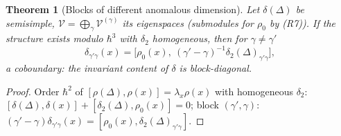 \documentclass[10pt]{article}
\newtheorem{theorem}{Theorem}[section]
\theoremstyle{definition}
\newcommand{\V}{\mathcal V}
\begin{document}
\begin{theorem}[Blocks of different anomalous dimension]\label{thm:blocks}
Let $\delta(\Delta)$ be semisimple, $\V=\bigoplus_\gamma\V^{(\gamma)}$ its eigenspaces (submodules for $\rho_0$ by (R7)). If the structure exists modulo $\hbar^3$ with $\delta_2$ homogeneous, then for $\gamma\ne\gamma'$
\[
\delta_{\gamma'\gamma}(x)=\big[\rho_0(x),\ (\gamma'-\gamma)^{-1}\delta_2(\Delta)_{\gamma'\gamma}\big],
\]
a coboundary: the invariant content of $\delta$ is block-diagonal.
\end{theorem}
\begin{proof}
Order $\hbar^2$ of $[\rho(\Delta),\rho(x)]=\lambda_x\rho(x)$ with homogeneous $\delta_2$: $[\delta(\Delta),\delta(x)]+[\delta_2(\Delta),\rho_0(x)]=0$; block $(\gamma',\gamma)$: $(\gamma'-\gamma)\delta_{\gamma'\gamma}(x)=[\rho_0(x),\delta_2(\Delta)_{\gamma'\gamma}]$.
\end{proof}
\end{document}
